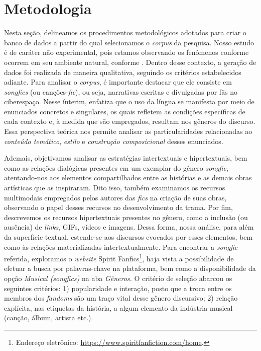 
\section{Metodologia}\label{sec-metodologia}

Nesta seção, delineamos os procedimentos metodológicos adotados para
criar o banco de dados a partir do qual selecionamos o \emph{corpus} da
pesquisa. Nosso estudo é de caráter não experimental, pois estamos
observando os fenômenos conforme ocorrem em seu ambiente natural,
conforme \textcite{sampieri2006}. Dentro desse contexto, a
geração de dados foi realizada de maneira qualitativa, seguindo os
critérios estabelecidos adiante. Para analisar o \emph{corpus}, é
importante destacar que ele consiste em \emph{songfics} (ou
canções-\emph{fic}), ou seja, narrativas escritas e divulgadas por fãs
no ciberespaço. Nesse ínterim, \cite{bakhtin_os_1997} enfatiza que o uso da
língua se manifesta por meio de enunciados concretos e singulares, os
quais refletem as condições específicas de cada contexto e, à medida que
são empregados, resultam nos gêneros do discurso. Essa perspectiva
teórica nos permite analisar as particularidades relacionadas ao
\emph{conteúdo temático}, \emph{estilo} e \emph{construção
composicional} desses enunciados.

Ademais, objetivamos analisar as estratégias intertextuais e
hipertextuais, bem como as relações dialógicas presentes em um exemplar
do gênero \emph{songfic}, atentando-nos aos elementos compartilhados
entre as histórias e as demais obras artísticas que as inspiraram. Dito
isso, também examinamos os recursos multimodais empregados pelos autores
das \emph{fics} na criação de suas obras, observando o papel desses
recursos no desenvolvimento da trama. Por fim, descrevemos os recursos
hipertextuais presentes no gênero, como a inclusão (ou ausência) de
\emph{links}, GIFs, vídeos e imagens. Dessa forma, nossa análise, para
além da superfície textual, estende-se aos discursos evocados por esses
elementos, bem como às relações materializadas intertextualmente. Para
encontrar a \emph{songfic} referida, exploramos o \emph{website} Spirit
Fanfics\footnote{Endereço eletrônico:
  \href{https://www.spiritfanfiction.com/home}{https://www.spiritfanfiction.com/home}.},
haja vista a possibilidade de efetuar a busca por palavras-chave na
plataforma, bem como a disponibilidade da opção \emph{Musical
(songfics)} na aba \emph{Gêneros.} O critério de seleção abarcou os
seguintes critérios: 1) popularidade e interação, posto que a troca
entre os membros dos \emph{fandoms} são um traço vital desse gênero
discursivo; 2) relação explícita, nas etiquetas da história, a algum
elemento da indústria musical (canção, álbum, artista etc.).

